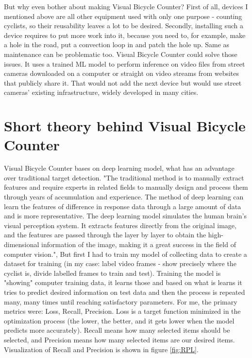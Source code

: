 But why even bother about making Visual Bicycle Counter? First of all, devices I mentioned above are all other equipment used with only one purpose - counting cyclists, so their reusability leaves a lot to be desired. Secondly, installing such a device requires to put more work into it, because you need to, for example, make a hole in the road, put a convection loop in and patch the hole up. Same as maintenance can be problematic too. Visual Bicycle Counter could solve those issues. It uses a trained ML model to perform inference on video files from street cameras downloaded on a computer or straight on video streams from websites that publicly share it. That would not add the next device but would use street cameras' existing infrastructure, widely developed in many cities.



\section{Short theory behind Visual Bicycle Counter}
\label{sec:theory}

Visual Bicycle Counter bases on deep learning model, what has an advantage over traditional target detection. "The traditional method is to manually extract features and require experts in related fields to manually design and process them through years of accumulation and experience. The method of deep learning can learn the features of difference in response data through a large amount of data and is more representative. The deep learning model simulates the human brain's visual perception system. It extracts features directly from the original image, and the features are passed through the layer by layer to obtain the high-dimensional information of the image, making it a great success in the field of computer vision."\cite{deepLearning}, But first I had to train my model of collecting data to create a dataset for training (in my case: label video frames - show precisely where the cyclist is, divide labelled frames to train and test). Training the model is "showing" computer training data, it learns those and based on what is learns it tries to predict desired information on test data and then the process is repeated many, many times until reaching satisfactory parameters. For me, the primary metrics were: Loss, Recall, Precision. Loss is a target function minimized in the optimization process (the lower, the better, and it gets lower when the model predicts more accurately). Recall means how many selected items should be selected, and Precision means how many selected items are our desired items. Visualization of Recall and Precision is shown in figure \ref{fig:RPL}.

